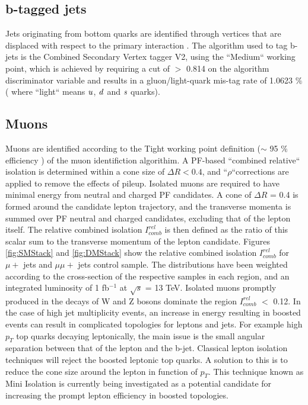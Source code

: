   

\subsection{b-tagged jets}
\label{sec:btags}
Jets originating from bottom quarks are identified through vertices that are displaced with respect to the primary interaction \cite{b-tagging}. The algorithm used to tag b-jets is the Combined Secondary Vertex tagger V2, using the ``Medium`` working point, which is achieved by requiring a cut of $>$ 0.814 on the algorithm discriminator variable and results in a gluon/light-quark mis-tag rate of 1.0623 $\%$ ( where ``light`` means $\it{u}$, $\it{d}$ and $\it{s}$ quarks).



\subsection{Muons}
\label{sec:muon-id}
Muons are identified according to the Tight working point definition ($\sim$ 95 $\%$ efficiency ) of the muon identifiction algorithim. A PF-based ``combined relative`` isolation is determined within a cone size of $\Delta R < 0.4 $, and ``$\rho$``corrections are applied to remove the effects of pileup. Isolated muons are required to have minimal energy from neutral and charged PF candidates. A cone of $\Delta R$ = 0.4 is formed around the candidate lepton trajectory, and the transverse momenta is summed over PF neutral and charged candidates, excluding that of the lepton itself. The relative combined isolation $I^{rel}_{comb}$ is then defined as the ratio of this scalar sum to the transverse momentum of the lepton candidate. 
Figures \ref{fig:SMStack} and \ref{fig:DMStack} show the relative combined isolation $I^{rel}_{comb}$ for $\mu +$ jets and $\mu\mu +$ jets control sample. The distributions have been weighted according to the cross-section of the respective samples in each region, and an integrated luminosity of 1 fb$^{-1}$ at $\sqrt{s}$ = 13 TeV. Isolated muons promptly produced in the decays of W and Z bosons dominate the region $I^{rel}_{comb}$ $<$ 0.12.
In the case of high jet multiplicity events, an increase in energy resulting in boosted events can result in complicated topologies for leptons and jets. For example high $p_{T}$ top quarks decaying leptonically, the main issue is the small angular separation between that of the lepton and the b-jet. Classical lepton isolation techniques will reject the boosted leptonic top quarks. A solution to this is to reduce the cone size around the lepton in function of $p_{T}$. This technique known as Mini Isolation is currently being investigated as a potential candidate for increasing the prompt lepton efficiency in boosted topologies.  

